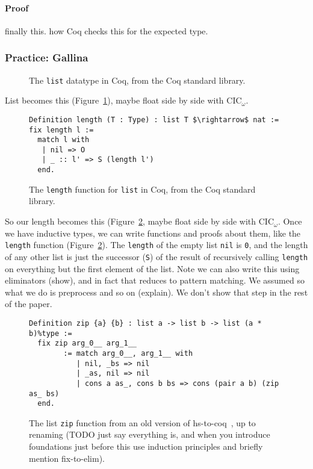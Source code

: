 \paragraph{Proof}
finally this.
how Coq checks this for the expected type.

\subsubsection{Practice: Gallina}

\begin{figure}
   
\caption{The \lstinline{list} datatype in Coq, from the Coq standard library.}
\label{fig:list}
\end{figure}

List becomes this (Figure~\ref{fig:list}), maybe float side by side with CIC$_{\omega}$.

\begin{figure}
\begin{lstlisting}
Definition length (T : Type) : list T $\rightarrow$ nat := fix length l :=
  match l with
   | nil => O
   | _ :: l' => S (length l')
  end.
\end{lstlisting}
\caption{The \lstinline{length} function for \lstinline{list} in Coq, from the Coq standard library.}
\label{fig:length}
\end{figure}

So our length becomes this (Figure~\ref{fig:length}, maybe float side by side with CIC$_{\omega}$.
Once we have inductive types, we can write functions and proofs about them, like the \lstinline{length} function (Figure~\ref{fig:length}).
The \lstinline{length} of the empty list \lstinline{nil} is \lstinline{0}, and the length of any other list
is just the successor (\lstinline{S}) of the result of recursively calling \lstinline{length} on everything but the first element of the list.
Note we can also write this using eliminators (show), and in fact that reduces to pattern matching.
We assumed  so what we do is preprocess and so on (explain).
We don't show that step in the rest of the paper.

\begin{figure}
\begin{lstlisting}
Definition zip {a} {b} : list a -> list b -> list (a * b)%type :=
  fix zip arg_0__ arg_1__
        := match arg_0__, arg_1__ with
           | nil, _bs => nil
           | _as, nil => nil
           | cons a as_, cons b bs => cons (pair a b) (zip as_ bs)
  end.
\end{lstlisting}
\caption{The list \lstinline{zip} function from an old version of hs-to-coq~\cite{TODO}, up to renaming (TODO just say everything is, and when you introduce foundations just before this use induction principles and briefly mention fix-to-elim).}
\label{fig:zip}
\end{figure}

